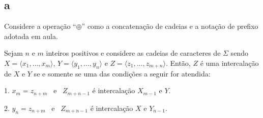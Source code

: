 \subsection{a} Considere a operação ``$\oplus$'' como a concatenação de cadeias e a notação de prefixo adotada em aula.

\begin{theorem}
    Sejam $n$ e $m$ inteiros positivos e considere as cadeias de caracteres de $\Sigma$ sendo $X = \langle x_1, \ldots, x_m \rangle$, $Y = \langle y_1, \ldots, y_n \rangle$ e $Z = \langle z_1, \ldots, z_{m + n} \rangle$. Então, $Z$ é uma intercalação de $X$ e $Y$ se e somente se uma das condições a seguir for atendida:

    1. $x_m = z_{n + m}$ ~e~ $Z_{m + n - 1}$ é intercalação $X_{m - 1}$ e $Y$.

    2. $y_n = z_{n + m}$ ~e~ $Z_{m + n - 1}$ é intercalação $X$ e $Y_{n - 1}$.
\end{theorem}

